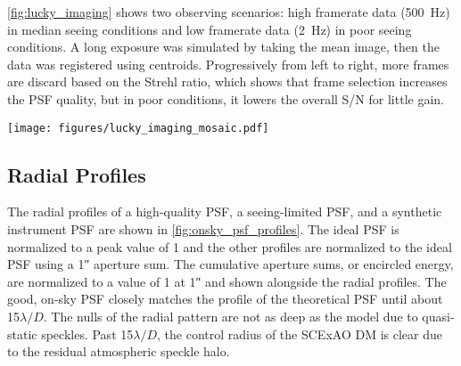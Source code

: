 \autoref{fig:lucky_imaging} shows two observing scenarios: high framerate data (\SI{500}{\hertz}) in median seeing conditions and low framerate data (\SI{2}{\hertz}) in poor seeing conditions. A long exposure was simulated by taking the mean image, then the data was registered using centroids. Progressively from left to right, more frames are discard based on the Strehl ratio, which shows that frame selection increases the PSF quality, but in poor conditions, it lowers the overall S/N for little gain.

\begin{figure*}
    \centering
    \texttt{[image: figures/lucky\_imaging\_mosaic.pdf]}
    \caption{Post-processing data with lucky imaging. All data are shown with a log stretch and separate limits for each frame. (Top) high-framerate (\SI{500}{\hertz}) data in median seeing conditions. (Bottom) low-framerate (\SI{2}{\hertz}) data in mediocre seeing conditions. (Long Exp.) a mean combination without alignment, simulating a long exposure. (Shift-and-add) co-registering each frame before collapsing. (Discarding X\%) same as shift-and-add but discarding a percentage of data based on the Strehl ratio.\label{fig:lucky_imaging}}
\end{figure*}

\subsection{Radial Profiles}
The radial profiles of a high-quality PSF, a seeing-limited PSF, and a synthetic instrument PSF are shown in \autoref{fig:onsky_psf_profiles}. The ideal PSF is normalized to a peak value of 1 and the other profiles are normalized to the ideal PSF using a \ang{;;1} aperture sum. The cumulative aperture sums, or encircled energy, are normalized to a value of 1 at \ang{;;1} and shown alongside the radial profiles. The good, on-sky PSF closely matches the profile of the theoretical PSF until about 15$\lambda/D$. The nulls of the radial pattern are not as deep as the model due to quasi-static speckles. Past 15$\lambda/D$, the control radius of the SCExAO DM is clear due to the residual atmospheric speckle halo.

